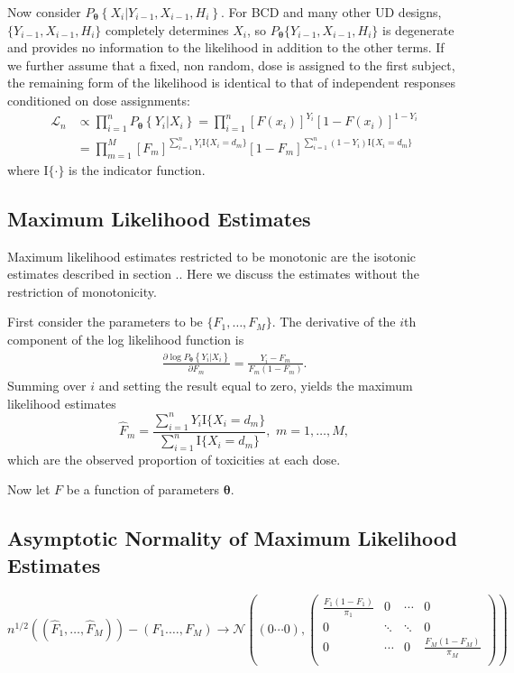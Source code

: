 Now consider $P_{\boldsymbol{\theta}}\left\{	X_i\vert  Y_{i-1}, X_{i-1}, H_i	\right\}$.  For BCD and many other UD designs, 
$\{Y_{i-1}, X_{i-1}, H_i	\}$ completely determines $X_i$, so $P_{\boldsymbol{\theta}}\{Y_{i-1}, X_{i-1}, H_i	\}$ is degenerate and provides no information to the likelihood in addition to the other terms.  If we further assume that a fixed, non random, dose is assigned to the first subject, the remaining form of the likelihood is identical to that of independent responses conditioned on dose assignments:
 \begin{align}\label{eq:LK}
\mathcal{L}_n
&\propto
\prod_{i=1}^n P_{\boldsymbol{\theta}}\left\{ 	Y_i\vert X_i	\right\}=\prod_{i=1}^n [F(x_i)]^{Y_i} [1-F(x_i)]^{1-Y_i}\\
&=\prod_{m=1}^M [F_m]^{\sum_{i=1}^n Y_i \textrm{I}\{X_i=d_m\}} [1-F_m]^{\sum_{i=1}^n (1-Y_i) \textrm{I}\{X_i=d_m\}}
\end{align}
where $\textrm{I}\{\cdot\}$ is the indicator function.

\subsection{Maximum Likelihood Estimates}
Maximum likelihood estimates restricted to be monotonic are the isotonic estimates described in section ..  Here we discuss the estimates without the restriction of monotonicity.

First consider the parameters to be $\{F_1, \ldots, F_M\}$.  The derivative of the $i$th component of the log likelihood function is
\begin{align}
\frac{\partial \log P_{\boldsymbol{\theta}}\left\{ 	Y_i\vert X_i	\right\}}{\partial F_m}=\frac{Y_i-F_m}{F_m(1-F_m)}.
\end{align}
Summing over $i$ and setting the result equal to zero, yields the maximum likelihood estimates $$\widehat F_m=\frac{\sum_{i=1}^nY_i  \textrm{I}\{X_i=d_m\}}{\sum_{i=1}^n \textrm{I}\{X_i=d_m\}},\, \, 
m=1,\ldots,M,$$
which are the observed proportion of toxicities at each dose.

Now let $F$ be a function of parameters $\boldsymbol{\theta}$.


\subsection{Asymptotic Normality of Maximum Likelihood Estimates}
\begin{equation}
n^{1/2}\left(
(\widehat F_1,\ldots,
  \widehat F_M)\right) -\left(
F_1.\ldots, F_M \right)
\longrightarrow \mathcal{N}\left((0\cdots0),\left(\begin{array}{cccc}
\frac{F_1(1-F_1)}{\pi_1}&0& \cdots&0 \\ 
  0&\ddots&\ddots & 0 \\ 
 0&  \cdots & 0& \frac{F_M(1-F_M)} {\pi_M}\\ 
\end{array}\right)\right)
\end{equation}

